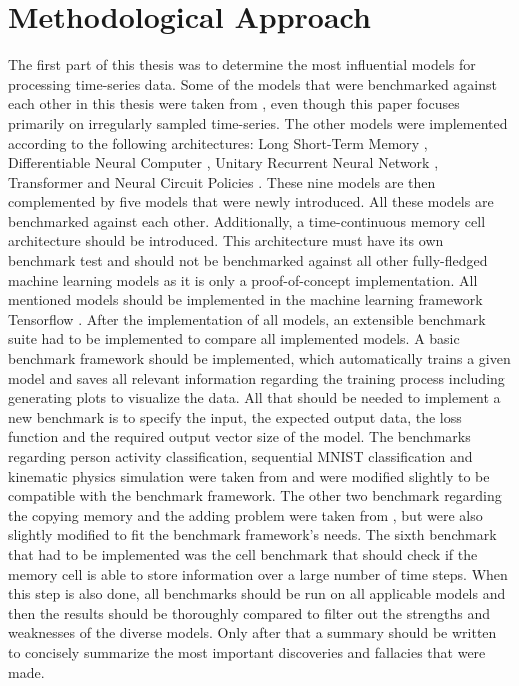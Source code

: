 \documentclass[draft,final]{vutinfth} %
\begin{document}
    \section{Methodological Approach}
    The first part of this thesis was to determine the most influential models for processing time-series data.
    Some of the models that were benchmarked against each other in this thesis were taken from \cite{ODELSTM}, even though this paper focuses primarily on irregularly sampled time-series.
    The other models were implemented according to the following architectures: Long Short-Term Memory \cite{LSTM}, Differentiable Neural Computer \cite{DNC}, Unitary Recurrent Neural Network \cite{EfficientUnitaryRNNs}, Transformer \cite{Transformer} and Neural Circuit Policies \cite{NCP}.
    These nine models are then complemented by five models that were newly introduced.
    All these models are benchmarked against each other.
    Additionally, a time-continuous memory cell architecture should be introduced.
    This architecture must have its own benchmark test and should not be benchmarked against all other fully-fledged machine learning models as it is only a proof-of-concept implementation.
    All mentioned models should be implemented in the machine learning framework Tensorflow \cite{Tensorflow}.
    After the implementation of all models, an extensible benchmark suite had to be implemented to compare all implemented models.
    A basic benchmark framework should be implemented, which automatically trains a given model and saves all relevant information regarding the training process including generating plots to visualize the data.
    All that should be needed to implement a new benchmark is to specify the input, the expected output data, the loss function and the required output vector size of the model.
    The benchmarks regarding person activity classification, sequential MNIST classification and kinematic physics simulation were taken from \cite{ODELSTM} and were modified slightly to be compatible with the benchmark framework.
    The other two benchmark regarding the copying memory and the adding problem were taken from \cite{UnitaryRNNs}, but were also slightly modified to fit the benchmark framework's needs.
    The sixth benchmark that had to be implemented was the cell benchmark that should check if the memory cell is able to store information over a large number of time steps.
    When this step is also done, all benchmarks should be run on all applicable models and then the results should be thoroughly compared to filter out the strengths and weaknesses of the diverse models.
    Only after that a summary should be written to concisely summarize the most important discoveries and fallacies that were made.
\end{document}
